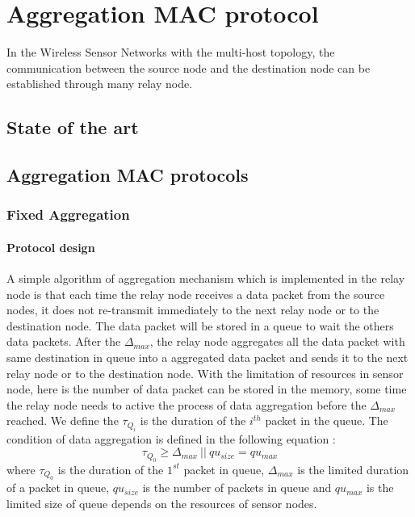 \chapter{Aggregation MAC protocol}
\label{aggregation}
In the Wireless Sensor Networks with the multi-host topology, the communication between the source node and the destination node can be established through many relay node.
\section{State of the art}
\section{Aggregation MAC protocols}
\subsection{Fixed Aggregation}
\subsubsection{Protocol design}
\label{sec:fa_design}
A simple algorithm of aggregation mechanism which is implemented in the relay node is that each time the relay node receives a data packet from the source nodes, it does not re-transmit immediately to the next relay node or to the destination node. The data packet will be stored in a queue to wait the others data packets. After the $\Delta_{max}$, the relay node aggregates all the data packet with same destination in queue into a aggregated data packet and sends it to the next relay node or to the destination node. With the limitation of resources in sensor node, here is the number of data packet can be stored in the memory, some time the relay node needs to active the process of data aggregation before the $\Delta_{max}$ reached. We define the $\tau_{Q_i}$ is the duration of the $i^{th}$ packet in the queue. The condition of data aggregation is defined in the following equation :
\begin{equation}
\tau_{Q_0} \geq \Delta_{max}\ ||\ qu_{size} = qu_{max}
\label{eq:fa_condition}
\end{equation}
where $\tau_{Q_0}$ is the duration of the $1^{st}$ packet in queue, $\Delta_{max}$ is the limited duration of a packet in queue, $qu_{size}$ is the number of packets in queue and $qu_{max}$ is the limited size of queue depends on the resources of sensor nodes.

